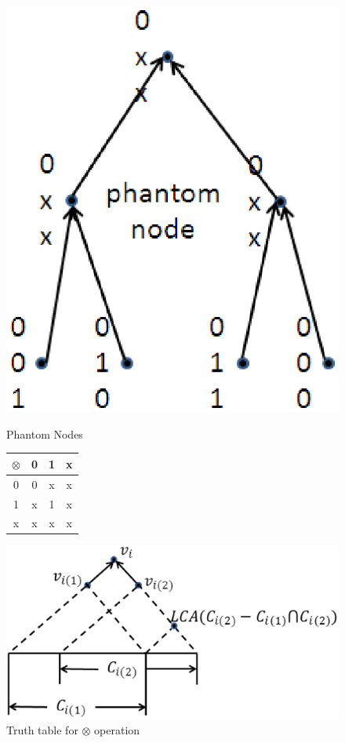 \begin{figure}[!ht]
\begin{minipage}[b]{0.3\linewidth}
\centering
\includegraphics[scale=0.5]{figures/phantom_node.eps}
\caption{Phantom Nodes}
\label{fig:phantom-node}
\end{minipage}
\hspace{0.1cm}
\begin{minipage}[b]{0.3\linewidth}
\centering
\begin{tabular}{c|ccc}
$\otimes$ & 0 & 1 & x \\
\hline 
0 & 0 & x & x \\
1 & x & 1 & x \\
x & x & x & x 
\end{tabular}
\caption{Truth table for $\otimes$ operation}
\label{fig:truth-table}
\end{minipage}
\hspace{0.1cm}
\begin{minipage}[b]{0.3\linewidth}
\centering
\includegraphics[scale=0.3]{figures/dag-overlap.eps}

\end{minipage}
\end{figure}
